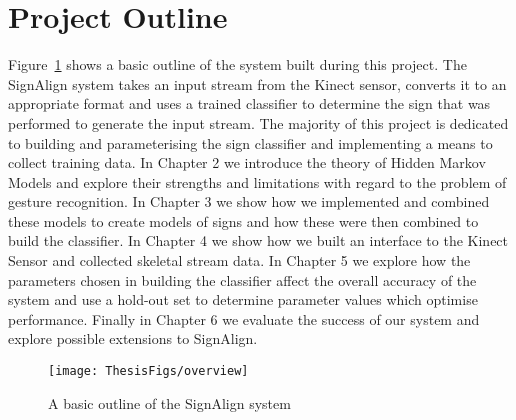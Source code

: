 \section{Project Outline}

Figure~\ref{fig:outline} shows a basic outline of the system built during this project. The SignAlign system takes an input stream from the Kinect sensor, converts it to an appropriate format and uses a trained classifier to determine the sign that was performed to generate the input stream. The majority of this project is dedicated to building and parameterising the sign classifier and implementing a means to collect training data. In Chapter 2 we introduce the theory of Hidden Markov Models and explore their strengths and limitations with regard to the problem of gesture recognition. In Chapter 3 we show how we implemented and combined these models to create models of signs and how these were then combined to build the classifier. In Chapter 4 we show how we built an interface to the Kinect Sensor and collected skeletal stream data. In Chapter 5 we explore how the parameters chosen in building the classifier affect the overall accuracy of the system and use a hold-out set to determine parameter values which optimise performance. Finally in Chapter 6 we evaluate the success of our system and explore possible extensions to SignAlign.

\begin{figure}[]
  \centering
    \texttt{[image: ThesisFigs/overview]}
  \caption{A basic outline of the SignAlign system}\label{fig:outline}
\end{figure}



